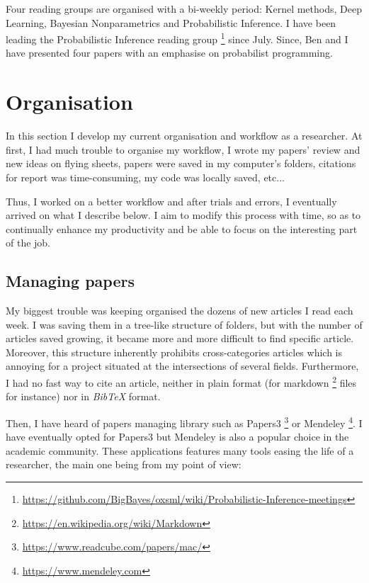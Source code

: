Four reading groups are organised with a bi-weekly period: Kernel methods, Deep Learning, Bayesian Nonparametrics and Probabilistic Inference.
I have been leading the Probabilistic Inference reading group \footnote{\url{https://github.com/BigBayes/oxsml/wiki/Probabilistic-Inference-meetings}} since July. Since, Ben and I have presented four papers \cite{Ritchie:2016ve, Edward, Ritchie:2015tx, DelMoral:2015jk} with an emphasise on probabilist programming.

\section{Organisation}
In this section I develop my current organisation and workflow as a researcher.
At first, I had much trouble to organise my workflow, I wrote my papers' review and new ideas on flying sheets, papers were saved in my computer's folders, citations for report was time-consuming, my code was locally saved, etc... 

Thus, I worked on a better workflow and after trials and errors, I eventually arrived on what I describe below.
I aim to modify this process with time, so as to continually enhance my productivity and be able to focus on the interesting part of the job.

\subsection{Managing papers}
My biggest trouble was keeping organised the dozens of new articles I read each week.
I was saving them in a tree-like structure of folders, but with the number of articles saved growing, it became more and more difficult to find specific article.
Moreover, this structure inherently prohibits cross-categories articles which is annoying for a project situated at the intersections of several fields.
Furthermore, I had no fast way to cite an article, neither in plain format (for markdown \footnote{\url{https://en.wikipedia.org/wiki/Markdown}} files for instance) nor in \emph{BibTeX} format.

Then, I have heard of papers managing library such as Papers3 \footnote{\url{https://www.readcube.com/papers/mac/}} or Mendeley \footnote{\url{https://www.mendeley.com}}.
I have eventually opted for Papers3 but Mendeley is also a popular choice in the academic community.
These applications features many tools easing the life of a researcher, the main one being from my point of view:

